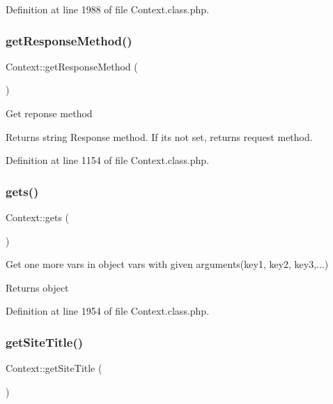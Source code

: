 Definition at line 1988 of file Context.\+class.\+php.

\mbox{\label{classContext_a1d02a15209360034cd719d8b08cb5061}} 
\subsubsection{\texorpdfstring{get\+Response\+Method()}{getResponseMethod()}}
{\footnotesize\ttfamily Context\+::get\+Response\+Method (\begin{DoxyParamCaption}{ }\end{DoxyParamCaption})}

Get reponse method

\begin{DoxyReturn}{Returns}
string Response method. If it\textquotesingle{}s not set, returns request method. 
\end{DoxyReturn}


Definition at line 1154 of file Context.\+class.\+php.

\mbox{\label{classContext_ae906c0b1533a8e4ce7836d3665b46288}} 
\subsubsection{\texorpdfstring{gets()}{gets()}}
{\footnotesize\ttfamily Context\+::gets (\begin{DoxyParamCaption}{ }\end{DoxyParamCaption})}

Get one more vars in object vars with given arguments(key1, key2, key3,...)

\begin{DoxyReturn}{Returns}
object 
\end{DoxyReturn}


Definition at line 1954 of file Context.\+class.\+php.

\mbox{\label{classContext_a0ee79330d3ee12c811cd784e24a7b017}} 
\subsubsection{\texorpdfstring{get\+Site\+Title()}{getSiteTitle()}}
{\footnotesize\ttfamily Context\+::get\+Site\+Title (\begin{DoxyParamCaption}{ }\end{DoxyParamCaption})}

